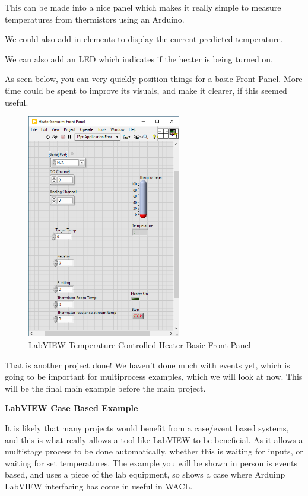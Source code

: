 \documentclass[a4paper,11pt]{report}
\begin{document}
This can be made into a nice panel which makes it really simple to measure temperatures from thermistors using an Arduino.

We could also add in elements to display the current predicted temperature.

We can also add an LED which indicates if the heater is being turned on.

As seen below, you can very quickly position things for a basic Front Panel. More time could be spent to improve its visuals, and make it clearer, if this seemed useful.

\begin{figure}[H]
\centering
\includegraphics[width=0.6\textwidth]{screenshots/labview46}
\caption{LabVIEW Temperature Controlled Heater Basic Front Panel}
\end{figure}

That is another project done! We haven't done much with events yet, which is going to be important for multiprocess examples, which we will look at now. This will be the final main example before the main project.

\textbf{LabVIEW Case Based Example}

It is likely that many projects would benefit from a case/event based systems, and this is what really allows a tool like LabVIEW to be beneficial. As it allows a multistage process to be done automatically, whether this is waiting for inputs, or waiting for set temperatures. The example you will be shown in person is events based, and uses a piece of the lab equipment, so shows a case where Arduinp LabVIEW interfacing has come in useful in WACL.
\end{document}
